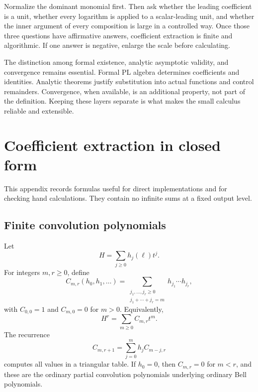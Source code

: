\documentclass[11pt,oneside]{article}
\numberwithin{equation}{section}
\theoremstyle{definition}
\begin{document}
\begin{summarybox}
Normalize the dominant monomial first.  Then ask whether the leading
coefficient is a unit, whether every logarithm is applied to a scalar-leading
unit, and whether the inner argument of every composition is large in a
controlled way.  Once those three questions have affirmative answers,
coefficient extraction is finite and algorithmic.  If one answer is negative,
enlarge the scale before calculating.
\end{summarybox}

The distinction among formal existence, analytic asymptotic validity, and
convergence remains essential.  Formal PL algebra determines coefficients and
identities.  Analytic theorems justify substitution into actual functions and
control remainders.  Convergence, when available, is an additional property,
not part of the definition.  Keeping these layers separate is what makes the
small calculus reliable and extensible.

\appendix

\section{Coefficient extraction in closed form}\label{app:coefficients}

This appendix records formulas useful for direct implementations and for
checking hand calculations.  They contain no infinite sums at a fixed output
level.

\subsection{Finite convolution polynomials}

Let
\[
  H=\sum_{j\ge0}h_j(\ell)t^j.
\]
For integers \(m,r\ge0\), define
\begin{equation}\label{eq:Cmr-definition}
  C_{m,r}(h_0,h_1,\ldots)
  =\sum_{\substack{j_1,\ldots,j_r\ge0\\j_1+\cdots+j_r=m}}
      h_{j_1}\cdots h_{j_r},
\end{equation}
with \(C_{0,0}=1\) and \(C_{m,0}=0\) for \(m>0\).  Equivalently,
\[
  H^r=\sum_{m\ge0}C_{m,r}t^m.
\]
The recurrence
\begin{equation}\label{eq:Cmr-recurrence}
  C_{m,r+1}=\sum_{j=0}^{m}h_j C_{m-j,r}
\end{equation}
computes all values in a triangular table.  If \(h_0=0\), then
\(C_{m,r}=0\) for \(m<r\), and these are the ordinary partial convolution
polynomials underlying ordinary Bell polynomials.
\end{document}
